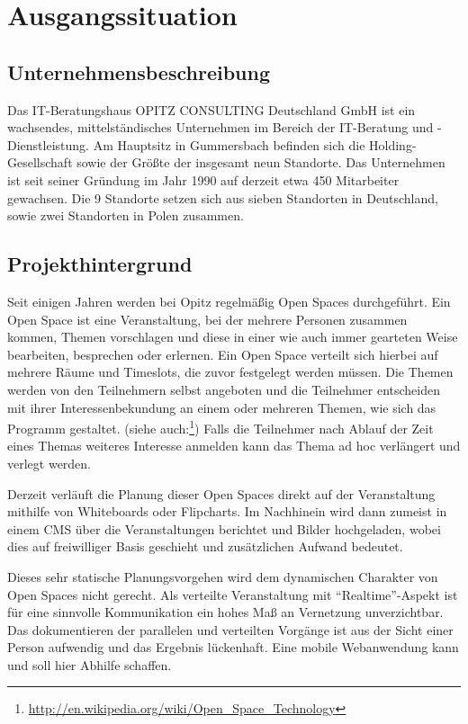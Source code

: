 \section{Ausgangssituation}
\subsection{Unternehmensbeschreibung}
Das IT-Beratungshaus OPITZ CONSULTING Deutschland GmbH ist ein
wachsendes, mittelständisches Unternehmen im Bereich der IT-Beratung
und -Dienstleistung. Am Hauptsitz in Gummersbach befinden sich die
Holding-Gesellschaft sowie der Größte der insgesamt neun Standorte.
Das Unternehmen ist seit seiner Gründung im Jahr 1990 auf derzeit etwa
450 Mitarbeiter gewachsen. Die 9 Standorte setzen sich aus sieben
Standorten in Deutschland, sowie zwei Standorten in Polen zusammen.
\subsection{Projekthintergrund}
Seit einigen Jahren werden bei Opitz regelmäßig Open Spaces durchgeführt.
Ein Open Space ist eine Veranstaltung, bei der mehrere Personen
zusammen kommen, Themen vorschlagen und diese in einer wie auch immer
gearteten Weise bearbeiten, besprechen oder erlernen. Ein Open Space
verteilt sich hierbei auf mehrere Räume und Timeslots, die zuvor
festgelegt werden müssen. Die Themen werden von den Teilnehmern selbst
angeboten und die Teilnehmer entscheiden mit ihrer Interessenbekundung
an einem oder mehreren Themen, wie sich das Programm gestaltet.
(siehe auch:\footnote{\url{http://en.wikipedia.org/wiki/Open_Space_Technology}})
Falls die Teilnehmer nach Ablauf der Zeit eines Themas weiteres
Interesse anmelden kann das Thema ad hoc verlängert und verlegt werden.

\noindent Derzeit verläuft die Planung dieser Open Spaces direkt auf
der Veranstaltung mithilfe von Whiteboards oder Flipcharts. Im
Nachhinein wird dann zumeist in einem \gls{CMS} über die Veranstaltungen
berichtet und Bilder hochgeladen, wobei dies auf freiwilliger Basis
geschieht und zusätzlichen Aufwand bedeutet.

\noindent Dieses sehr statische Planungsvorgehen wird dem dynamischen
Charakter von Open Spaces nicht gerecht. Als verteilte Veranstaltung
mit ``Realtime''-Aspekt ist für eine sinnvolle Kommunikation ein hohes
Maß an Vernetzung unverzichtbar. Das dokumentieren der parallelen und
verteilten Vorgänge ist aus der Sicht einer Person aufwendig und das
Ergebnis lückenhaft. Eine mobile Webanwendung kann und soll hier
Abhilfe schaffen.
